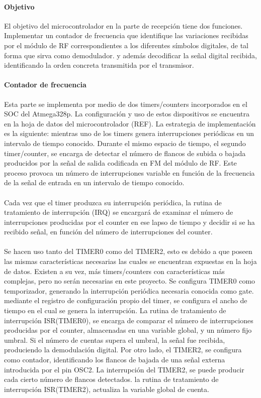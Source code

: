\paragraph{Objetivo} El objetivo del microcontrolador en la parte de recepción tiene dos funciones. Implementar un contador de frecuencia que identifique las variaciones recibidas por el m\'odulo de RF correspondientes a los diferentes s\'imbolos digitales, de tal forma que sirva como demodulador. y además decodificar la señal digital recibida, identificando la orden concreta transmitida por el transmisor.

\paragraph{Contador de frecuencia} Esta parte se implementa por medio de dos timers/counters incorporados en el SOC del Atmega328p. La configuraci\'on y uso de estos dispositivos se encuentra en la hoja de datos del microcontrolador (REF). La estrategia de implementación es la siguiente: mientras uno de los timers genera interrupciones periódicas en un intervalo de tiempo conocido. Durante el mismo espacio de tiempo, el segundo timer/counter, se encarga de detectar el número de flancos de subida o bajada producidos por la señal de salida codificada en FM del módulo de RF. Este proceso provoca un número de interrupciones variable en función de la frecuencia de la señal de entrada en un intervalo de tiempo conocido.

\paragraph{} Cada vez que el timer produzca su interrupción periódica, la rutina de tratamiento de interrupción (IRQ) se encargará de examinar el número de interrupciones producidas por el counter en ese lapso de tiempo y decidir si se ha recibido señal, en función del número de interrupciones del counter.

\paragraph{} Se hacen uso tanto del TIMER0 como del TIMER2, esto es debido a que poseen las mismas caracter\'isticas necesarias las cuales se encuentran expuestas en la hoja de datos. Existen a su vez, más timers/counters con características más complejas, pero no serán necesarias en este proyecto.
Se configura TIMER0 como temporizador, generando la interrupci\'on periódica necesaria conocida como gate. mediante el registro de configuración propio del timer, se configura el ancho de tiempo en el cual se genera la interrupción. La rutina de tratamiento de interrupción ISR(TIMER0), se encarga de comparar el número de interrupciones producidas por el counter, almacenadas en una variable global, y un número fijo umbral. Si el número de cuentas supera el umbral, la señal fue recibida, produciendo la demodulación digital. Por otro lado, el TIMER2, se configura como contador, identificando los flancos de bajada de una señal externa introducida por el pin OSC2. La interrupción del TIMER2, se puede producir cada cierto número de flancos detectados. la rutina de tratamiento de interrupción ISR(TIMER2), actualiza la variable global de cuenta.

